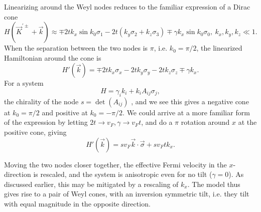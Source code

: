 Linearizing around the Weyl nodes reduces to the familiar expression of a Dirac cone
\begin{equation}
  \label{eq:7}
  H(\vec{K} ^{'\pm} + \vec{k}) \approx \mp 2 t k_{x} \sin k_{0} \sigma_{1} - 2 t (k_{y} \sigma_{2} + k_{z} \sigma_{3}) \mp \gamma k_{x} \sin k_{0} \sigma_{0}, \: k_{x}, k_{y}, k_{z} \ll 1.
\end{equation}
When the separation between the two nodes is \(\pi\), i.e. \(k_{0} = \pi/ 2 \), the linearized Hamiltonian around the cone is
\begin{equation}
  \label{eq:8}
  H'(\vec{k}) = \mp 2 t k_{x} \sigma_{x} - 2t k_{y} \sigma_{y} - 2 t k_{z} \sigma_{z} \mp \gamma k_{x}.
\end{equation}
For a system
\begin{equation}
  \label{eq:155}
  H = \gamma_i k_i + k_i A_{ij} \sigma_j,
\end{equation}
the chirality of the node \( s = \det(A_{ij}) \) \cite{mccormickMinimalModelsTopological2017}, and we see this gives a negative cone at \( k_0 = \pi /2 \) and positive at \( k_0 = -\pi /2 \).
We could arrive at a more familiar form of the expression by letting \( 2 t \to v_F, \gamma \to v_F t \), and do a \( \pi \) rotation around \( x \) at the positive cone, giving
\begin{equation}
  \label{eq:158}
  H'(\vec{k}) = s v_F \vec{k} \cdot \vec{\sigma} + s v_F t k_x.
\end{equation}

Moving the two nodes closer together, the effective Fermi velocity in the \(x\)-direction is rescaled, and the system is anisotropic even for no tilt (\(\gamma=0\)).
As discussed earlier, this may be mitigated by a rescaling of \( k_x \).
The model thus gives rise to a pair of Weyl cones, with an inversion symmetric tilt, i.e. they tilt with equal magnitude in the opposite direction.


